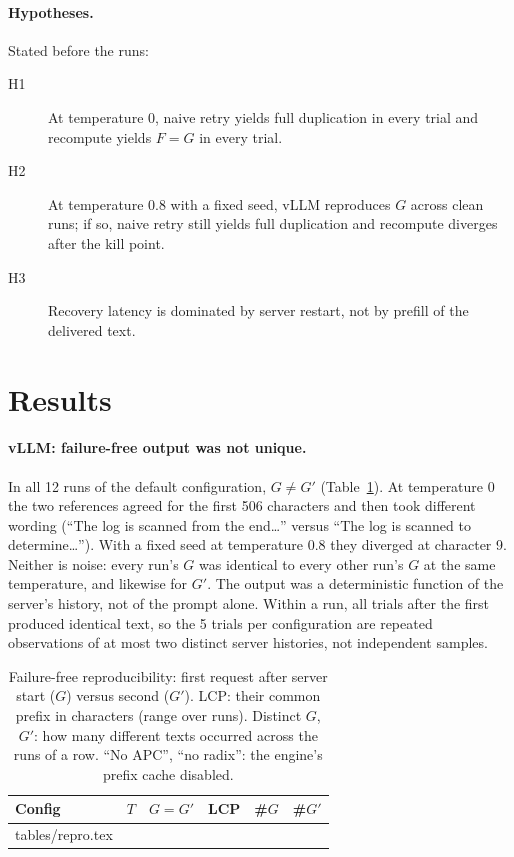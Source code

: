 \documentclass[10pt,twocolumn]{article}
\makeatletter
\def\ReproRows{\@@input tables/repro.tex }
\makeatother
\begin{document}
\paragraph{Hypotheses.} Stated before the runs:
\begin{description}
  \item[H1] At temperature 0, naive retry yields full duplication in every
    trial and recompute yields $F=G$ in every trial.
  \item[H2] At temperature 0.8 with a fixed seed, vLLM reproduces $G$
    across clean runs; if so, naive retry still yields full duplication and
    recompute diverges after the kill point.
  \item[H3] Recovery latency is dominated by server restart, not by prefill
    of the delivered text.
\end{description}

\section{Results}
\label{sec:results}

\paragraph{vLLM: failure-free output was not unique.} In all 12 runs of the
default configuration, $G\neq G'$
(Table~\ref{tab:repro}). At temperature 0 the two references agreed for the
first 506 characters and then took different wording (``The log is scanned
from the end\dots'' versus ``The log is scanned to determine\dots''). With a
fixed seed at temperature 0.8 they diverged at character 9. Neither is noise:
every run's $G$ was identical to every other run's $G$ at the same
temperature, and likewise for $G'$. The output was a deterministic function
of the server's history, not of the prompt alone. Within a run, all trials
after the first produced identical text, so the 5 trials per configuration
are repeated observations of at most two distinct server histories, not
independent samples.

\begin{table}[h]
\centering\small
\caption{Failure-free reproducibility: first request after server start
($G$) versus second ($G'$). LCP: their common prefix in characters (range
over runs). Distinct $G$, $G'$: how many different texts occurred across the
runs of a row. ``No APC'', ``no radix'': the engine's prefix cache disabled.}
\label{tab:repro}
\begin{tabular}{@{}lccccc@{}}
\toprule
Config & $T$ & $G{=}G'$ & LCP & \#$G$ & \#$G'$ \\
\midrule
\ReproRows
\bottomrule
\end{tabular}
\end{table}
\end{document}
